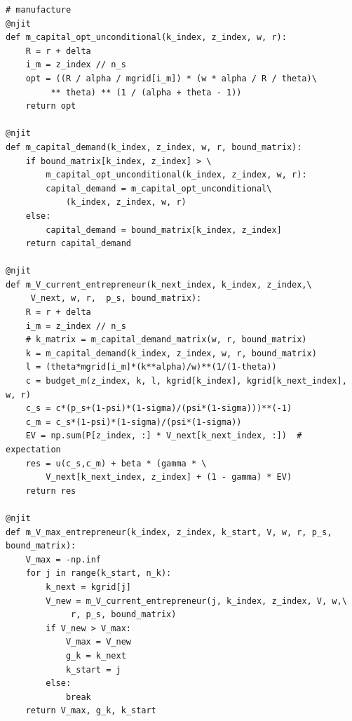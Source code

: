 \documentclass[a4paper, 12pt]{ctexart}
\begin{document}
\begin{lstlisting}
# manufacture
@njit
def m_capital_opt_unconditional(k_index, z_index, w, r):
    R = r + delta
    i_m = z_index // n_s
    opt = ((R / alpha / mgrid[i_m]) * (w * alpha / R / theta)\
         ** theta) ** (1 / (alpha + theta - 1))
    return opt

@njit
def m_capital_demand(k_index, z_index, w, r, bound_matrix):
    if bound_matrix[k_index, z_index] > \
        m_capital_opt_unconditional(k_index, z_index, w, r):
        capital_demand = m_capital_opt_unconditional\
            (k_index, z_index, w, r)
    else:
        capital_demand = bound_matrix[k_index, z_index]
    return capital_demand

@njit
def m_V_current_entrepreneur(k_next_index, k_index, z_index,\
     V_next, w, r,  p_s, bound_matrix):
    R = r + delta
    i_m = z_index // n_s
    # k_matrix = m_capital_demand_matrix(w, r, bound_matrix)
    k = m_capital_demand(k_index, z_index, w, r, bound_matrix)
    l = (theta*mgrid[i_m]*(k**alpha)/w)**(1/(1-theta))
    c = budget_m(z_index, k, l, kgrid[k_index], kgrid[k_next_index], w, r)
    c_s = c*(p_s+(1-psi)*(1-sigma)/(psi*(1-sigma)))**(-1)
    c_m = c_s*(1-psi)*(1-sigma)/(psi*(1-sigma))
    EV = np.sum(P[z_index, :] * V_next[k_next_index, :])  # expectation
    res = u(c_s,c_m) + beta * (gamma * \
        V_next[k_next_index, z_index] + (1 - gamma) * EV)
    return res

@njit
def m_V_max_entrepreneur(k_index, z_index, k_start, V, w, r, p_s, bound_matrix):
    V_max = -np.inf
    for j in range(k_start, n_k):
        k_next = kgrid[j]
        V_new = m_V_current_entrepreneur(j, k_index, z_index, V, w,\
             r, p_s, bound_matrix)
        if V_new > V_max:
            V_max = V_new
            g_k = k_next
            k_start = j
        else:
            break
    return V_max, g_k, k_start
\end{lstlisting}
\end{document}
